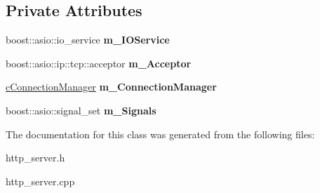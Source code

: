 \subsection*{\-Private \-Attributes}
\begin{DoxyCompactItemize}
\item 
\hypertarget{classhttp__server_1_1cHttpServer_ae02a73720c1b0fa45b787ef0cecacb6c}{boost\-::asio\-::io\-\_\-service {\bfseries m\-\_\-\-I\-O\-Service}}\label{classhttp__server_1_1cHttpServer_ae02a73720c1b0fa45b787ef0cecacb6c}

\item 
\hypertarget{classhttp__server_1_1cHttpServer_a2d4db5bec75f0594e81403e8659ec2a0}{boost\-::asio\-::ip\-::tcp\-::acceptor {\bfseries m\-\_\-\-Acceptor}}\label{classhttp__server_1_1cHttpServer_a2d4db5bec75f0594e81403e8659ec2a0}

\item 
\hypertarget{classhttp__server_1_1cHttpServer_a87a2959bcad40f733bb9bd79f03bc017}{\hyperlink{classhttp__server_1_1cConnectionManager}{c\-Connection\-Manager} {\bfseries m\-\_\-\-Connection\-Manager}}\label{classhttp__server_1_1cHttpServer_a87a2959bcad40f733bb9bd79f03bc017}

\item 
\hypertarget{classhttp__server_1_1cHttpServer_a6332aa8cd965ba14ee125d90e309c483}{boost\-::asio\-::signal\-\_\-set {\bfseries m\-\_\-\-Signals}}\label{classhttp__server_1_1cHttpServer_a6332aa8cd965ba14ee125d90e309c483}

\end{DoxyCompactItemize}


\-The documentation for this class was generated from the following files\-:\begin{DoxyCompactItemize}
\item 
http\-\_\-server.\-h\item 
http\-\_\-server.\-cpp\end{DoxyCompactItemize}
